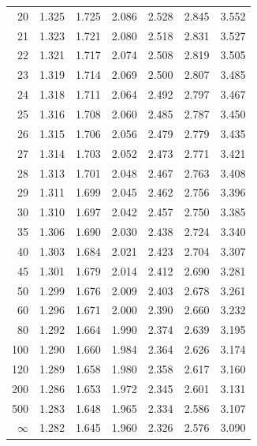 \begin{center}
\begin{tabular}{r|cccccc}
20 & 1.325 & 1.725 & 2.086 & 2.528 & 2.845 & 3.552\\
21 & 1.323 & 1.721 & 2.080 & 2.518 & 2.831 & 3.527\\
22 & 1.321 & 1.717 & 2.074 & 2.508 & 2.819 & 3.505\\
23 & 1.319 & 1.714 & 2.069 & 2.500 & 2.807 & 3.485\\
24 & 1.318 & 1.711 & 2.064 & 2.492 & 2.797 & 3.467\\
25 & 1.316 & 1.708 & 2.060 & 2.485 & 2.787 & 3.450\\
26 & 1.315 & 1.706 & 2.056 & 2.479 & 2.779 & 3.435\\
27 & 1.314 & 1.703 & 2.052 & 2.473 & 2.771 & 3.421\\
28 & 1.313 & 1.701 & 2.048 & 2.467 & 2.763 & 3.408\\
29 & 1.311 & 1.699 & 2.045 & 2.462 & 2.756 & 3.396\\
30 & 1.310 & 1.697 & 2.042 & 2.457 & 2.750 & 3.385\\
35 & 1.306 & 1.690 & 2.030 & 2.438 & 2.724 & 3.340\\
40 & 1.303 & 1.684 & 2.021 & 2.423 & 2.704 & 3.307\\
45 & 1.301 & 1.679 & 2.014 & 2.412 & 2.690 & 3.281\\
50 & 1.299 & 1.676 & 2.009 & 2.403 & 2.678 & 3.261\\
60 & 1.296 & 1.671 & 2.000 & 2.390 & 2.660 & 3.232\\
80 & 1.292 & 1.664 & 1.990 & 2.374 & 2.639 & 3.195\\
100 & 1.290 & 1.660 & 1.984 & 2.364 & 2.626 & 3.174\\
120 & 1.289 & 1.658 & 1.980 & 2.358 & 2.617 & 3.160\\
200 & 1.286 & 1.653 & 1.972 & 2.345 & 2.601 & 3.131\\
500 & 1.283 & 1.648 & 1.965 & 2.334 & 2.586 & 3.107\\
$\infty$ & 1.282 & 1.645 & 1.960 & 2.326 & 2.576 & 3.090\\\bottomrule
\end{tabular}\end{center}
